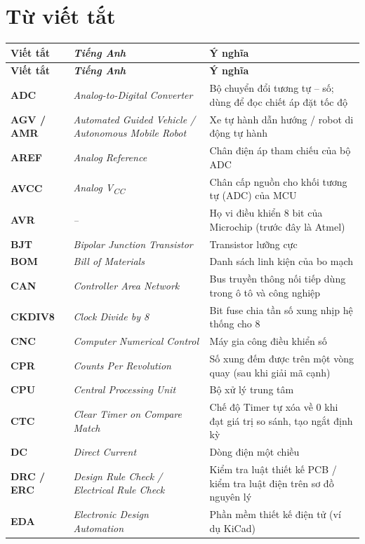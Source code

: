 \section*{Từ viết tắt}
{\small
\begin{longtable}{@{}>{\raggedright\arraybackslash\bfseries}p{2.7cm}>{\raggedright\arraybackslash\itshape}p{4.6cm}>{\raggedright\arraybackslash}p{7.6cm}@{}}
\toprule
\normalfont\bfseries Viết tắt & \normalfont\bfseries Tiếng Anh & \textbf{Ý nghĩa}\\
\midrule\endfirsthead
\toprule
\normalfont\bfseries Viết tắt & \normalfont\bfseries Tiếng Anh & \textbf{Ý nghĩa}\\
\midrule\endhead
\bottomrule\endfoot
ADC & Analog-to-Digital Converter & Bộ chuyển đổi tương tự -- số; dùng để đọc chiết áp đặt tốc độ\\
AGV / AMR & Automated Guided Vehicle / Autonomous Mobile Robot & Xe tự hành dẫn hướng / robot di động tự hành\\
AREF & Analog Reference & Chân điện áp tham chiếu của bộ ADC\\
AVCC & Analog V\textsubscript{CC} & Chân cấp nguồn cho khối tương tự (ADC) của MCU\\
AVR & -- & Họ vi điều khiển 8 bit của Microchip (trước đây là Atmel)\\
BJT & Bipolar Junction Transistor & Transistor lưỡng cực\\
BOM & Bill of Materials & Danh sách linh kiện của bo mạch\\
CAN & Controller Area Network & Bus truyền thông nối tiếp dùng trong ô tô và công nghiệp\\
CKDIV8 & Clock Divide by 8 & Bit fuse chia tần số xung nhịp hệ thống cho 8\\
CNC & Computer Numerical Control & Máy gia công điều khiển số\\
CPR & Counts Per Revolution & Số xung đếm được trên một vòng quay (sau khi giải mã cạnh)\\
CPU & Central Processing Unit & Bộ xử lý trung tâm\\
CTC & Clear Timer on Compare Match & Chế độ Timer tự xóa về 0 khi đạt giá trị so sánh, tạo ngắt định kỳ\\
DC & Direct Current & Dòng điện một chiều\\
DRC / ERC & Design Rule Check / Electrical Rule Check & Kiểm tra luật thiết kế PCB / kiểm tra luật điện trên sơ đồ nguyên lý\\
EDA & Electronic Design Automation & Phần mềm thiết kế điện tử (ví dụ KiCad)\\

\end{longtable}}
